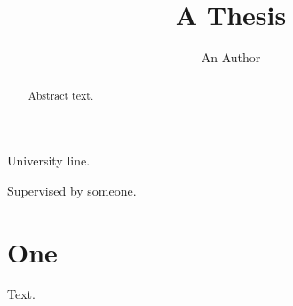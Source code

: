 \documentclass{report}
\title{A Thesis}\author{An Author}
\begin{document}
\maketitle

\noindent University line.

\vspace{10mm}

\noindent Supervised by someone.
\begin{abstract}
Abstract text.
\end{abstract}
\chapter{One}
Text.
\end{document}
